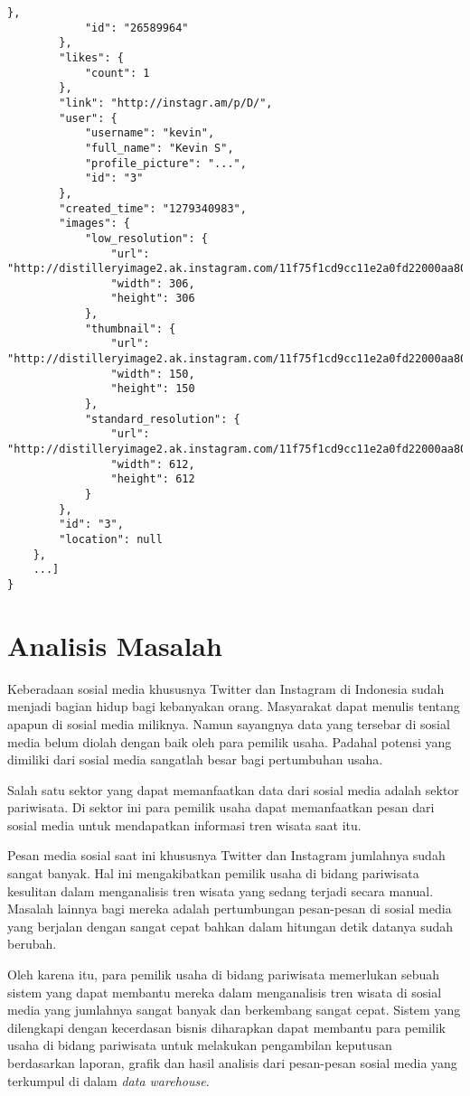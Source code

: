 \begin{lstlisting}[basicstyle=\tiny,caption=Response Tag Endpoint Media Recent,label={lst:response_tag_endpoint_media}]
            },
            "id": "26589964"
        },
        "likes": {
            "count": 1
        },
        "link": "http://instagr.am/p/D/",
        "user": {
            "username": "kevin",
            "full_name": "Kevin S",
            "profile_picture": "...",
            "id": "3"
        },
        "created_time": "1279340983",
        "images": {
            "low_resolution": {
                "url": "http://distilleryimage2.ak.instagram.com/11f75f1cd9cc11e2a0fd22000aa8039a_6.jpg",
                "width": 306,
                "height": 306
            },
            "thumbnail": {
                "url": "http://distilleryimage2.ak.instagram.com/11f75f1cd9cc11e2a0fd22000aa8039a_5.jpg",
                "width": 150,
                "height": 150
            },
            "standard_resolution": {
                "url": "http://distilleryimage2.ak.instagram.com/11f75f1cd9cc11e2a0fd22000aa8039a_7.jpg",
                "width": 612,
                "height": 612
            }
        },
        "id": "3",
        "location": null
    },
    ...]
}
\end{lstlisting}

\section{Analisis Masalah}
Keberadaan sosial media khususnya Twitter dan Instagram di Indonesia sudah menjadi bagian hidup bagi kebanyakan orang. Masyarakat dapat menulis tentang apapun di sosial media miliknya. Namun sayangnya data yang tersebar di sosial media belum diolah dengan baik oleh para pemilik usaha. Padahal potensi yang dimiliki dari sosial media sangatlah besar bagi pertumbuhan usaha.

Salah satu sektor yang dapat memanfaatkan data dari sosial media adalah sektor pariwisata. Di sektor ini para pemilik usaha dapat memanfaatkan pesan dari sosial media untuk mendapatkan informasi tren wisata saat itu. 

Pesan media sosial saat ini khususnya Twitter dan Instagram jumlahnya sudah sangat banyak. Hal ini mengakibatkan pemilik usaha di bidang pariwisata kesulitan dalam menganalisis tren wisata yang sedang terjadi secara manual. Masalah lainnya bagi mereka adalah pertumbungan pesan-pesan di sosial media yang berjalan dengan sangat cepat bahkan dalam hitungan detik datanya sudah berubah. 

Oleh karena itu, para pemilik usaha di bidang pariwisata memerlukan sebuah sistem yang dapat membantu mereka dalam menganalisis tren wisata di sosial media yang jumlahnya sangat banyak dan berkembang sangat cepat. Sistem yang dilengkapi dengan kecerdasan bisnis diharapkan dapat membantu para pemilik usaha di bidang pariwisata untuk melakukan pengambilan keputusan berdasarkan laporan, grafik dan hasil analisis dari pesan-pesan sosial media yang terkumpul di dalam \textit{data warehouse}. 

